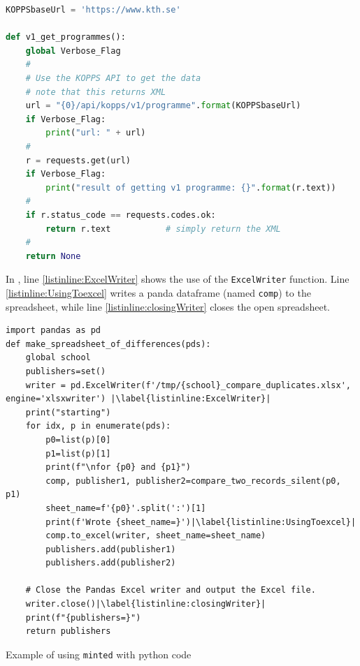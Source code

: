 \documentclass[nomenclature, english, bibtex]{kththesis}
\numberwithin{listing}{chapter}
\begin{document}
\lstset{extendedchars=true}  %
\begin{lstlisting}[language={Python}, caption={Using a python program to
    access the KTH API to get all of the programs at KTH}, label=lst:programmes]
KOPPSbaseUrl = 'https://www.kth.se'

def v1_get_programmes():
    global Verbose_Flag
    #
    # Use the KOPPS API to get the data
    # note that this returns XML
    url = "{0}/api/kopps/v1/programme".format(KOPPSbaseUrl)
    if Verbose_Flag:
        print("url: " + url)
    #
    r = requests.get(url)
    if Verbose_Flag:
        print("result of getting v1 programme: {}".format(r.text))
    #
    if r.status_code == requests.codes.ok:
        return r.text           # simply return the XML
    #
    return None
\end{lstlisting}
\FloatBarrier

In , line \ref{listinline:ExcelWriter} shows the use of the \texttt{ExcelWriter} function. Line \ref{listinline:UsingToexcel} writes a panda dataframe (named \texttt{comp}) to the spreadsheet, while line \ref{listinline:closingWriter} closes the open spreadsheet.

\begin{listing}[!ht]
\begin{verbatim}
import pandas as pd
def make_spreadsheet_of_differences(pds):
    global school
    publishers=set()
    writer = pd.ExcelWriter(f'/tmp/{school}_compare_duplicates.xlsx', engine='xlsxwriter') |\label{listinline:ExcelWriter}|
    print("starting")
    for idx, p in enumerate(pds):
        p0=list(p)[0]
        p1=list(p)[1]
        print(f"\nfor {p0} and {p1}")
        comp, publisher1, publisher2=compare_two_records_silent(p0, p1)
        sheet_name=f'{p0}'.split(':')[1]
        print(f'Wrote {sheet_name=}')|\label{listinline:UsingToexcel}|
        comp.to_excel(writer, sheet_name=sheet_name)
        publishers.add(publisher1)
        publishers.add(publisher2)
    
    # Close the Pandas Excel writer and output the Excel file.
    writer.close()|\label{listinline:closingWriter}|
    print(f"{publishers=}")
    return publishers
\end{verbatim}
\caption{Example of using \texttt{minted} with python code}
\label{lst:exampleUsingMinted}
\end{listing}

\FloatBarrier
\end{document}
